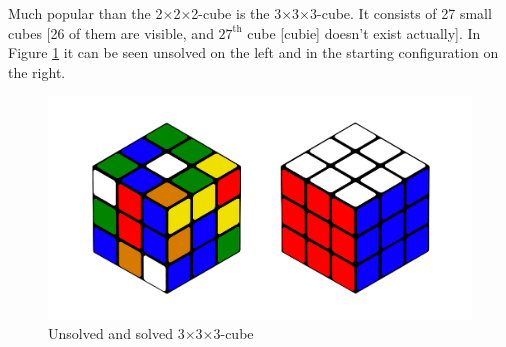 \documentclass[12pt,a4paper]{article}
\theoremstyle{custom}
\newcommand{\Ttwo}{2$\times$2$\times$2-}
\newcommand{\Tthree}{3$\times$3$\times$3-}
\begin{document}
Much popular than the \Ttwo cube  is the \Tthree cube. It consists of 27 small cubes [26 of them are visible, and $27^\text{th}$ cube [cubie] doesn't exist actually]. 
\newpage
In Figure \ref{Figure_3erCube} it can be seen unsolved on the left and in the starting configuration on the right.

\begin{figure}[h]
\centering
\includegraphics[scale=0.11]{3x3_sc_so.png}
\caption[Unsolved and solved \Tthree cube]{Unsolved and solved \Tthree cube}
\label{Figure_3erCube}
\end{figure}

\\
\end{document}

